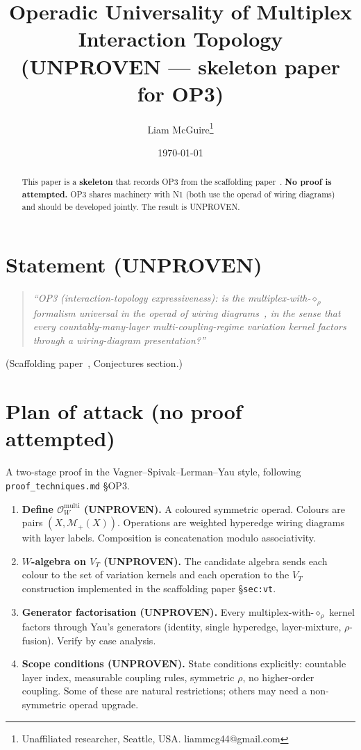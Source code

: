 \documentclass[11pt]{article}
\title{Operadic Universality of Multiplex Interaction Topology \\
       \large (UNPROVEN --- skeleton paper for OP3)}
\author{Liam McGuire\thanks{Unaffiliated researcher, Seattle, USA. liammcg44@gmail.com}}
\date{\today}
\theoremstyle{plain}
\theoremstyle{definition}
\begin{document}
\maketitle

\begin{abstract}
This paper is a \textbf{skeleton} that records OP3 from the
scaffolding paper~\cite{emergent_systems_2026}. \textbf{No proof is
attempted.} OP3 shares machinery with N1 (both use the operad of
wiring diagrams) and should be developed jointly. The result is
UNPROVEN.
\end{abstract}

\section{Statement (UNPROVEN)}

\begin{quote}
\emph{``OP3 (interaction-topology expressiveness): is the
multiplex-with-$\diamond_\rho$ formalism universal in the operad of
wiring diagrams~\cite{vagner2015algebras}, in the sense that every
countably-many-layer multi-coupling-regime variation kernel factors
through a wiring-diagram presentation?''}
\end{quote}
\noindent (Scaffolding paper~\cite{emergent_systems_2026},
Conjectures section.)

\section{Plan of attack (no proof attempted)}

A two-stage proof in the Vagner--Spivak--Lerman--Yau style,
following \texttt{proof\_techniques.md} §OP3.

\begin{enumerate}[leftmargin=2em,itemsep=4pt]
  \item \textbf{Define $\mathcal{O}_W^{\mathrm{multi}}$ (UNPROVEN).}
    A coloured symmetric operad. Colours are pairs
    $(X, \mathcal{M}_+(X))$. Operations are weighted hyperedge
    wiring diagrams with layer labels. Composition is concatenation
    modulo associativity.
  \item \textbf{$W$-algebra on $V_T$ (UNPROVEN).} The candidate
    algebra sends each colour to the set of variation kernels and
    each operation to the $V_T$ construction implemented in the
    scaffolding paper §\texttt{sec:vt}.
  \item \textbf{Generator factorisation (UNPROVEN).} Every
    multiplex-with-$\diamond_\rho$ kernel factors through Yau's
    generators (identity, single hyperedge, layer-mixture,
    $\rho$-fusion). Verify by case analysis.
  \item \textbf{Scope conditions (UNPROVEN).} State conditions
    explicitly: countable layer index, measurable coupling rules,
    symmetric $\rho$, no higher-order coupling. Some of these are
    natural restrictions; others may need a non-symmetric operad
    upgrade.
\end{enumerate}
\end{document}
